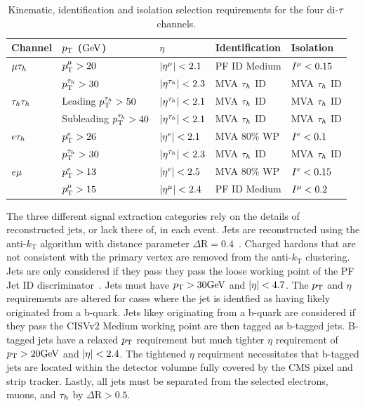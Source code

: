 \begin{table}[htbp]
\centering
\begin{small}
\begin{tabular}{l|l|l|l|l}
  Channel       & $p_\mathrm{T}$ ($\mathrm{GeV}$) & $\eta$ & Identification & Isolation \\
\hline
  $\mu\tau_{h}$       &   $p_\mathrm{T}^{\mu}>20$     &  $\lvert\eta^{\mu}\rvert<2.1$    &   PF ID Medium &  $I^{\mu}<0.15$       \\
                   &   $p_\mathrm{T}^{\tau_{h}}>30$  &  $\lvert\eta^{\tau_{h}}\rvert<2.3$ &   MVA $\tau_{h}$ ID  & MVA $\tau_{h}$ ID \\
\hline
 $\tau_{h}\tau_{h}$      &   Leading $p_\mathrm{T}^{\tau_{h}}>50$ & $\lvert\eta^{\tau_{h}}\rvert<2.1$  &    MVA $\tau_{h}$ ID    & MVA $\tau_{h}$ ID    \\
                   &   Subleading $p_\mathrm{T}^{\tau_{h}}>40$ & $\lvert\eta^{\tau_{h}}\rvert<2.1$  &    MVA $\tau_{h}$ ID & MVA $\tau_{h}$ ID    \\
\hline
  $e\tau_{h}$       &   $p_\mathrm{T}^{e}>26$      & $\lvert\eta^{e}\rvert<2.1$       &   MVA 80\% WP  &  $I^{e}<0.1$  \\
                   &   $p_\mathrm{T}^{\tau_{h}}>30$  &  $\lvert\eta^{\tau_{h}}\rvert<2.3$  &   MVA $\tau_{h}$ ID & MVA $\tau_{h}$ ID \\
\hline
  $e\mu$        &   $p_\mathrm{T}^{e}>13$    & $\lvert\eta^{e}\rvert<2.5$   &   MVA 80\% WP   & $I^{e}<0.15$   \\
                   &   $p_\mathrm{T}^{\mu}>15$   & $\lvert\eta^{\mu}\rvert<2.4$  & PF ID Medium &  $I^{\mu}<0.2$    \\
\hline
\end{tabular}
\end{small}
\caption{Kinematic, identification and isolation selection requirements for the four di-$\tau$ channels.
\label{tab:htt_obj_selection}
}
\end{table}


The three different signal extraction categories rely on the details of reconstructed jets, or
lack there of, in each event.  Jets are reconstructed using the anti-$k_{\text{T}}$ algorithm with distance
parameter $\Delta\text{R}=0.4$~\cite{Cacciari:2008gp}.  Charged hardons that are not consistent with
the primary vertex are removed from the anti-$k_{\text{T}}$ clustering.  Jets are only considered
if they pass they pass the loose working point of the PF Jet ID discriminator~\cite{jetID}.
Jets must have $p_\mathrm{T} > 30 \mathrm{GeV}$ and $\lvert\eta\rvert<4.7$.  The $p_\mathrm{T}$ and $\eta$ requirements are altered
for cases where the jet is identfied as having likely originated from a b-quark.  Jets likey originating
from a b-quark are considered if they pass the CISVv2 Medium working point are then tagged as b-tagged jets.
B-tagged jets have a relaxed $p_\mathrm{T}$ requirement but much tighter $\eta$ requirement of $p_\mathrm{T} > 20 \mathrm{GeV}$ 
and $\lvert\eta\rvert<2.4$.  The tightened $\eta$ requirment necessitates that b-tagged jets are located within
the detector volumne fully covered by the CMS pixel and strip tracker.
Lastly, all jets must be separated from the selected electrons, muons, and $\tau_{h}$ by $\Delta\text{R}>0.5$.

